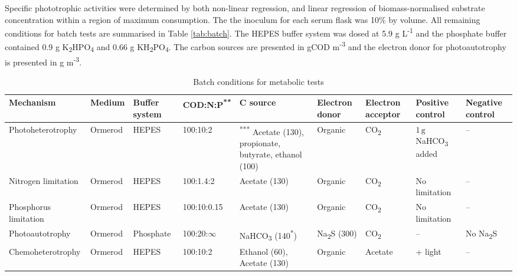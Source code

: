 \skippingparagraph
Specific phototrophic activities were determined by both non-linear regression, and linear regression of biomass-normalised substrate concentration within a region of maximum consumption. The the inoculum for each serum flask was 10\% by volume. All remaining conditions for batch tests are summarised in Table \ref{tab:batch}. The HEPES buffer system was dosed at 5.9 g L\textsuperscript{-1} and the phosphate buffer contained 0.9 g K\textsubscript{2}HPO\textsubscript{4} and 0.66 g KH\textsubscript{2}PO\textsubscript{4}. The carbon sources are presented in gCOD m\textsuperscript{-3} and the electron donor for photoautotrophy is presented in g m\textsuperscript{-3}. 

\begin{table}[tp]
    \centering
    \small
    \renewcommand{\arraystretch}{1.4}
    \caption{Batch conditions for metabolic tests}
    \tabcolsep=0.11cm
    \begin{tabular}{@{}p{3cm} p{1.4cm} p{1.5cm} p{1.7cm} p{1.4cm} p{1.4cm} p{1.4cm} p{1.4cm} p{1.4cm}@{}} \toprule
        Mechanism & Medium & Buffer system & COD:N:P\textsuperscript{**} & C source & Electron donor & Electron acceptor & Positive control & Negative control\\
        \hline
        Photoheterotrophy & Ormerod& HEPES & 100:10:2 & \textsuperscript{***} Acetate (130), propionate, butyrate, ethanol (100) & Organic & CO\textsubscript{2}&  $\mathrm{1\, g}$ NaHCO\textsubscript{3} added&  -- \\
        
        Nitrogen limitation & Ormerod&  HEPES & 100:1.4:2& Acetate (130) & Organic & CO\textsubscript{2}& No limitation & -- \\
        
        Phosphorus limitation & Ormerod & HEPES & 100:10:0.15 & Acetate (130) & Organic & CO\textsubscript{2}& No limitation & -- \\
        
        Photoautotrophy & Ormerod & Phosphate & 100:20:$\infty$ & NaHCO\textsubscript{3} (140\textsuperscript{*}) & Na\textsubscript{2}S (300)& CO\textsubscript{2}& -- & No Na\textsubscript{2}S \\
        
        Chemoheterotrophy & Ormerod & HEPES &100:10:2 & Ethanol (60), Acetate (130) & Organic& Acetate& + light& -- \\
        

\end{tabular}
\end{table}
